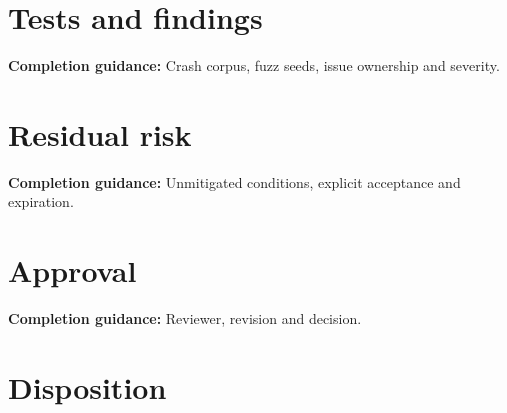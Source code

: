 \documentclass[10pt,letterpaper]{article}
\begin{document}
\section{Tests and findings}
\textbf{Completion guidance:} Crash corpus, fuzz seeds, issue ownership and severity.\par\medskip{}
\section{Residual risk}
\textbf{Completion guidance:} Unmitigated conditions, explicit acceptance and expiration.\par\medskip{}
\section{Approval}
\textbf{Completion guidance:} Reviewer, revision and decision.\par\medskip{}
\section{Disposition}
\end{document}

